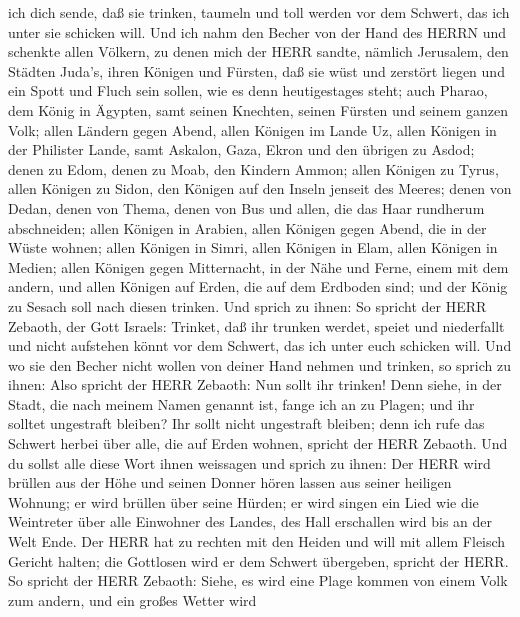 ich dich sende,  daß sie trinken, taumeln und toll werden
vor dem Schwert, das ich unter sie schicken will.  Und ich
nahm den Becher von der Hand des HERRN und schenkte allen Völkern, zu
denen mich der HERR sandte,  nämlich Jerusalem, den Städten
Juda's, ihren Königen und Fürsten, daß sie wüst und zerstört liegen und
ein Spott und Fluch sein sollen, wie es denn heutigestages steht;
 auch Pharao, dem König in Ägypten, samt seinen Knechten,
seinen Fürsten und seinem ganzen Volk;  allen Ländern gegen
Abend, allen Königen im Lande Uz, allen Königen in der Philister Lande,
samt Askalon, Gaza, Ekron und den übrigen zu Asdod;  denen
zu Edom, denen zu Moab, den Kindern Ammon;  allen Königen
zu Tyrus, allen Königen zu Sidon, den Königen auf den Inseln jenseit des
Meeres;  denen von Dedan, denen von Thema, denen von Bus
und allen, die das Haar rundherum abschneiden;  allen
Königen in Arabien, allen Königen gegen Abend, die in der Wüste wohnen;
 allen Königen in Simri, allen Königen in Elam, allen
Königen in Medien;  allen Königen gegen Mitternacht, in der
Nähe und Ferne, einem mit dem andern, und allen Königen auf Erden, die
auf dem Erdboden sind; und der König zu Sesach soll nach diesen trinken.
 Und sprich zu ihnen: So spricht der HERR Zebaoth, der Gott
Israels: Trinket, daß ihr trunken werdet, speiet und niederfallt und
nicht aufstehen könnt vor dem Schwert, das ich unter euch schicken will.
 Und wo sie den Becher nicht wollen von deiner Hand nehmen
und trinken, so sprich zu ihnen: Also spricht der HERR Zebaoth: Nun
sollt ihr trinken!  Denn siehe, in der Stadt, die nach
meinem Namen genannt ist, fange ich an zu Plagen; und ihr solltet
ungestraft bleiben? Ihr sollt nicht ungestraft bleiben; denn ich rufe
das Schwert herbei über alle, die auf Erden wohnen, spricht der HERR
Zebaoth.  Und du sollst alle diese Wort ihnen weissagen und
sprich zu ihnen: Der HERR wird brüllen aus der Höhe und seinen Donner
hören lassen aus seiner heiligen Wohnung; er wird brüllen über seine
Hürden; er wird singen ein Lied wie die Weintreter über alle Einwohner
des Landes, des Hall erschallen wird bis an der Welt Ende. 
Der HERR hat zu rechten mit den Heiden und will mit allem Fleisch
Gericht halten; die Gottlosen wird er dem Schwert übergeben, spricht der
HERR.  So spricht der HERR Zebaoth: Siehe, es wird eine
Plage kommen von einem Volk zum andern, und ein großes Wetter wird
